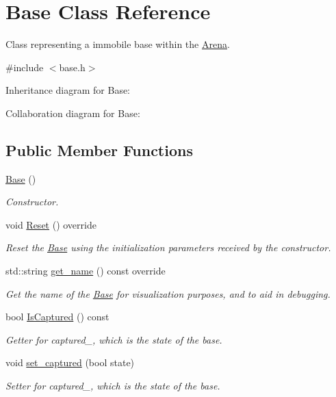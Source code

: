 \hypertarget{classBase}{}\section{Base Class Reference}
\label{classBase}


Class representing a immobile base within the \hyperlink{classArena}{Arena}.  




{\ttfamily \#include $<$base.\+h$>$}



Inheritance diagram for Base\+:


Collaboration diagram for Base\+:
\subsection*{Public Member Functions}
\begin{DoxyCompactItemize}
\item 
\hyperlink{classBase_a5ffe0568374d8b9b4c4ec32953fd6453}{Base} ()
\begin{DoxyCompactList}\small\item\em Constructor. \end{DoxyCompactList}\item 
void \hyperlink{classBase_aed35831f6e46b267305326389ec9d6da}{Reset} () override\hypertarget{classBase_aed35831f6e46b267305326389ec9d6da}{}\label{classBase_aed35831f6e46b267305326389ec9d6da}

\begin{DoxyCompactList}\small\item\em Reset the \hyperlink{classBase}{Base} using the initialization parameters received by the constructor. \end{DoxyCompactList}\item 
std\+::string \hyperlink{classBase_a02ef545d5165eed175f81c29f9881f07}{get\+\_\+name} () const override
\begin{DoxyCompactList}\small\item\em Get the name of the \hyperlink{classBase}{Base} for visualization purposes, and to aid in debugging. \end{DoxyCompactList}\item 
bool \hyperlink{classBase_a6a805a97e0a836cf354fd1e2e294d112}{Is\+Captured} () const 
\begin{DoxyCompactList}\small\item\em Getter for captured\+\_\+, which is the state of the base. \end{DoxyCompactList}\item 
void \hyperlink{classBase_a933e149b6a25c59ca631e2bb80a3c1df}{set\+\_\+captured} (bool state)\hypertarget{classBase_a933e149b6a25c59ca631e2bb80a3c1df}{}\label{classBase_a933e149b6a25c59ca631e2bb80a3c1df}

\begin{DoxyCompactList}\small\item\em Setter for captured\+\_\+, which is the state of the base. \end{DoxyCompactList}\end{DoxyCompactItemize}


